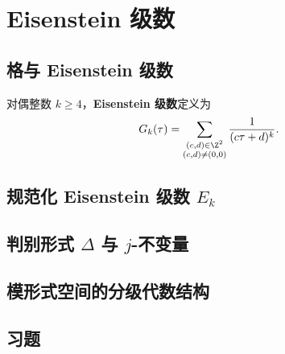 \chapter{Eisenstein 级数}
\label{ch:eisenstein-series}

\section{格与 Eisenstein 级数}

\begin{definition}[Eisenstein 级数]
对偶整数 $k \geq 4$，\textbf{Eisenstein 级数}定义为
\[
  G_k(\tau) = \sum_{\substack{(c,d) \in \Z^2 \\ (c,d) \neq (0,0)}}
  \frac{1}{(c\tau + d)^k}.
\]
\end{definition}


\section{规范化 Eisenstein 级数 $E_k$}


\section{判别形式 $\Delta$ 与 $j$-不变量}


\section{模形式空间的分级代数结构}


\section{习题}
